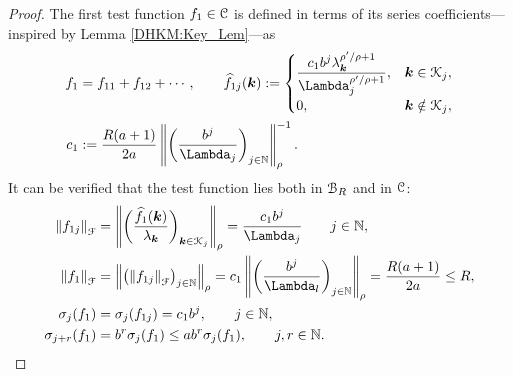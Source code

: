 \documentclass[USenglish]{article}
\theoremstyle{dgthm}
\theoremstyle{dgthm}
\theoremstyle{dgthm}
\theoremstyle{dgthm}
\theoremstyle{dgdef}
\newcommand{\hf}{\widehat{f}}
\newcommand{\norm}[2][{}]{\ensuremath{\left \lVert #2 \right \rVert}_{#1}}
\begin{document}
\begin{proof}
The first test function $f_1 \in {\mathcal{C}}$ is defined in terms of its series coefficients---inspired by Lemma \ref{DHKM:Key_Lem}---as
\begin{align}
\nonumber
f_1 &= f_{11} + f_{12} +  \cdots, \qquad
\hf_{1j}(\bsk) := \begin{cases}
\displaystyle
\frac{c_1 b^{j} \lambda_{\bsk}^{\rho'/\rho+1}}{\Lambda_j^{\rho'/\rho+1}},  & \bsk \in \calK_j,
\\
0, & \bsk \notin \calK_j,
\end{cases}
\\
\nonumber
c_1 &:=  \frac{R(a+1)}{2a} \norm[\rho]{ \biggl(\frac{b^{j}}{\Lambda_j} \biggr)_{j \in \N} }^{-1}.
\end{align}
It can be verified that the test function lies both in ${\mathcal{B}}_{R}$ and in ${\mathcal{C}}$:
\begin{align}
\nonumber
\norm[\calF]{f_{1j}} &= \norm[\rho]{\biggl(\frac{\hf_1(\bsk)}{\lambda_{\bsk}} \biggr)_{\bsk \in \calK_j}} 
= \frac{c_1 b^j}{\Lambda_j} \qquad j \in \N,\\
\nonumber
\norm[\calF]{f_1} &= \norm[\rho]{\bigl( \norm[\calF]{f_{1j}} \bigr)_{j \in \N} } 
=  c_1 \norm[\rho]{ \biggl(\frac{b^{j}}{\Lambda_l} \biggr)_{j \in \N} } = \frac{R(a+1)}{2a} \le R,
\\
\nonumber
\sigma_j(f_1) &= \sigma_j(f_{1j}) = 
c_1 b^{j}, \qquad j \in \N, 
\\
\nonumber
\sigma_{j+r}(f_1) &= 
b^{r} \sigma_j(f_1) \le a b^r \sigma_j(f_1), \qquad j,r \in \N.
\end{align}


\end{proof}
\end{document}
